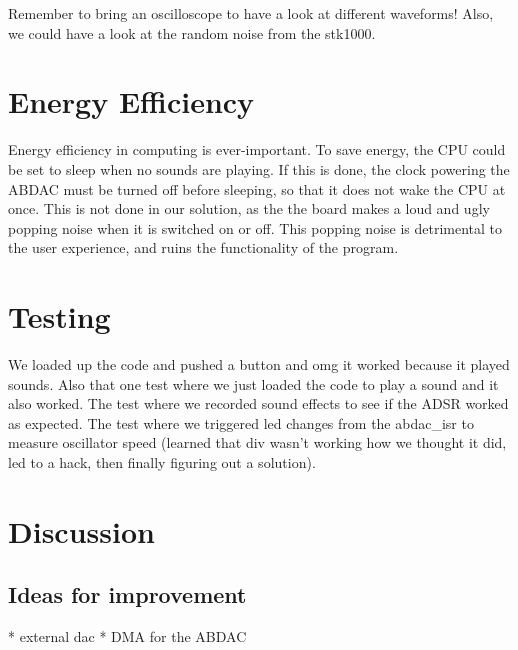 

Remember to bring an oscilloscope to have a look at different waveforms! Also, we could have a look at the random noise from the stk1000.

\section{Energy Efficiency}

Energy efficiency in computing is ever-important.
To save energy, the CPU could be set to sleep when no sounds are playing.
If this is done, the clock powering the ABDAC must be turned off before sleeping, so that it does not wake the CPU at once.
This is not done in our solution, as the the board makes a loud and ugly popping noise when it is switched on or off.
This popping noise is detrimental to the user experience, and ruins the functionality of the program.


\section{Testing}
We loaded up the code and pushed a button and omg it worked because it played sounds.
Also that one test where we just loaded the code to play a sound and it also worked.
The test where we recorded sound effects to see if the ADSR worked as expected.
The test where we triggered led changes from the abdac\_isr to measure oscillator speed (learned that div wasn't working how we thought it did, led to a hack, then finally figuring out a solution).


\section{Discussion}

\subsection{Ideas for improvement}

* external dac
* DMA for the ABDAC

